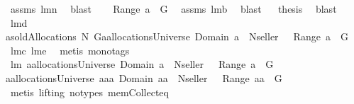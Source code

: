\begin{isabellebody}
\ assms\ lm{}{}n\ \isamarkupfalse%
\ blast\isanewline
{}\isamarkupfalse%
\ \isamarkupfalse%
\ {\isachardoublequoteopen}{\isasymUnion}\ Range\ a\ {\isasymsubseteq}\ G{\isachardoublequoteclose}\ \isamarkupfalse%
\ assms\ lm{}{}b\ \isamarkupfalse%
\ blast\isanewline
{}\isamarkupfalse%
\ \isamarkupfalse%
\ {\isacharquery}thesis\ \isamarkupfalse%
\ blast\isanewline
{}\isamarkupfalse%
%
\endisatagproof
{\isafoldproof}%
%
\isadelimproof
\isanewline
%
\endisadelimproof
\isanewline
{}\isamarkupfalse%
\ lm{}{}d{\isacharcolon}\ \isanewline
{\isachardoublequoteopen}{\isacharparenleft}a{\isasymin}soldAllocations{\isacharprime}{\isacharprime}\ N\ G{\isacharparenright}{\isacharequal}{\isacharparenleft}a{\isasymin}allocationsUniverse{\isacharampersand}\ Domain\ a\ {\isasymsubseteq}\ N{\isacharminus}{\isacharbraceleft}seller{\isacharbraceright}\ {\isacharampersand}\ {\isasymUnion}\ Range\ a\ {\isasymsubseteq}\ G{\isacharparenright}{\isachardoublequoteclose}\ \isanewline
%
\isadelimproof
%
\endisadelimproof
%
\isatagproof
{}\isamarkupfalse%
\ lm{}{}c\ lm{}{}e\ \isamarkupfalse%
\ {\isacharparenleft}metis\ {\isacharparenleft}mono{\isacharunderscore}tags{\isacharparenright}{\isacharparenright}%
\endisatagproof
{\isafoldproof}%
%
\isadelimproof
\isanewline
%
\endisadelimproof
\isanewline
{}\isamarkupfalse%
\ lm{}{}{\isacharcolon}\ {\isachardoublequoteopen}{\isacharparenleft}a{\isasymin}allocationsUniverse{\isacharampersand}\ Domain\ a\ {\isasymsubseteq}\ N{\isacharminus}{\isacharbraceleft}seller{\isacharbraceright}\ {\isacharampersand}\ {\isasymUnion}\ Range\ a\ {\isasymsubseteq}\ G{\isacharparenright}\ {\isacharequal}\ \isanewline
{\isacharparenleft}a{\isasymin}allocationsUniverse{\isacharampersand}\ a{\isasymin}{\isacharbraceleft}aa{\isachardot}\ Domain\ aa\ {\isasymsubseteq}\ N{\isacharminus}{\isacharbraceleft}seller{\isacharbraceright}\ {\isacharampersand}\ {\isasymUnion}\ Range\ aa\ {\isasymsubseteq}\ G{\isacharbraceright}{\isacharparenright}{\isachardoublequoteclose}\ \isanewline
%
\isadelimproof
%
\endisadelimproof
%
\isatagproof
{}\isamarkupfalse%
\ {\isacharparenleft}metis\ {\isacharparenleft}lifting{\isacharcomma}\ no{\isacharunderscore}types{\isacharparenright}\ mem{\isacharunderscore}Collect{\isacharunderscore}eq{\isacharparenright}%

\end{isabellebody}
